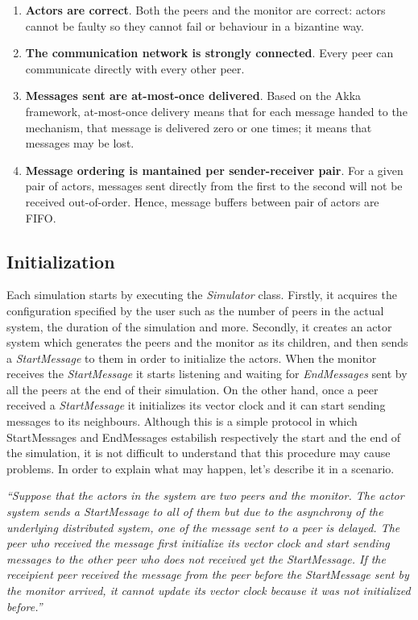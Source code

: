 \documentclass[10pt]{article}
\begin{document}
\begin{enumerate}
\item \textbf{Actors are correct}. Both the peers and the monitor are correct: actors cannot be faulty so they cannot fail or behaviour in a bizantine way.
\item \textbf{The communication network is strongly connected}. Every peer can communicate directly with every other peer.
\item \textbf{Messages sent are at-most-once delivered}. Based on the Akka framework, at-most-once delivery means that for each message handed to the mechanism, that message is delivered zero or one times; it means that messages may be lost.
\item \textbf{Message ordering is mantained per sender-receiver pair}. For a given pair of actors, messages sent directly from the first to the second will not be received out-of-order. Hence, message buffers between pair of actors are FIFO.
\end{enumerate}

\subsection{Initialization}

Each simulation starts by executing the \textit{Simulator} class. Firstly, it acquires the configuration specified by the user such as the number of peers in the actual system, the duration of the simulation and more. Secondly, it creates an actor system which generates the peers and the monitor as its children, and then sends a \textit{StartMessage} to them in order to initialize the actors. When the monitor receives the \textit{StartMessage} it starts listening and waiting for \textit{EndMessages} sent by all the peers at the end of their simulation. On the other hand, once a peer received a \textit{StartMessage} it initializes its vector clock and it can start sending messages to its neighbours.
Although this is a simple protocol in which StartMessages and EndMessages estabilish respectively the start and the end of the simulation, it is not difficult to understand that this procedure may cause problems. In order to explain what may happen, let's describe it in a scenario.

\vspace{0.2cm}
\emph{``Suppose that the actors in the system are two peers and the monitor. The actor system sends a StartMessage to all of them but due to the asynchrony of the underlying distributed system, one of the message sent to a peer is delayed. The peer who received the message first initialize its vector clock and start sending messages to the other peer who does not received yet the StartMessage. If the receipient peer received the message from the peer before the StartMessage sent by the monitor arrived, it cannot update its vector clock because it was not initialized before.''}
\vspace{0.1cm}
\end{document}
